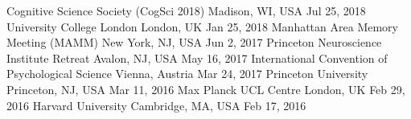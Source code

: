
\begin{cvhonors}
  \cvdateditem
    {Cognitive Science Society (CogSci 2018)}
    {Madison, WI, USA}
    {Jul 25, 2018}
  \cvdateditem
    {University College London}
    {London, UK}
    {Jan 25, 2018}
  \cvdateditem
    {Manhattan Area Memory Meeting (MAMM)}
    {New York, NJ, USA}
    {Jun 2, 2017}
  \cvdateditem
    {Princeton Neuroscience Institute Retreat}
    {Avalon, NJ, USA}
    {May 16, 2017}
  \cvdateditem
    {International Convention of Psychological Science}
    {Vienna, Austria}
    {Mar 24, 2017}
  \cvdateditem
    {Princeton University}
    {Princeton, NJ, USA}
    {Mar 11, 2016}
  \cvdateditem
    {Max Planck UCL Centre}
    {London, UK}
    {Feb 29, 2016}
  \cvdateditem
    {Harvard University}
    {Cambridge, MA, USA}
    {Feb 17, 2016}
\end{cvhonors}